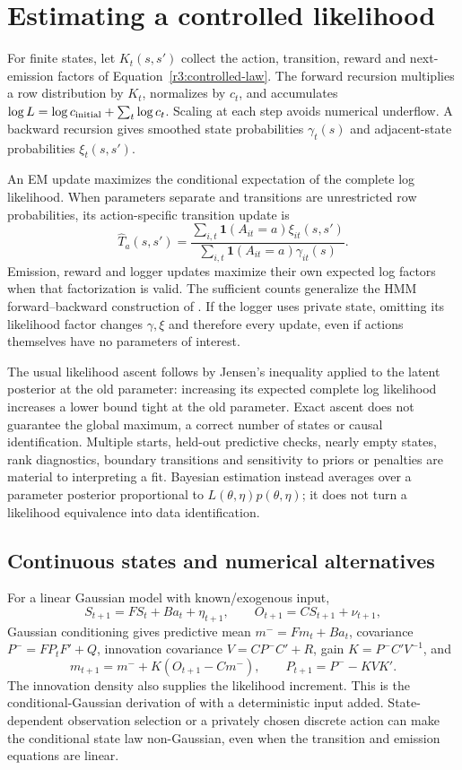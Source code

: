 \section{Estimating a controlled likelihood}
\label{r3:controlled-estimation}
For finite states, let $K_t(s,s')$ collect the action, transition,
reward and next-emission factors of Equation~\eqref{r3:controlled-law}.
The forward recursion multiplies a row distribution by $K_t$, normalizes
by $c_t$, and accumulates $\log L=\log c_{\rm initial}+\sum_t\log c_t$.
Scaling at each step avoids numerical underflow. A backward recursion
gives smoothed state probabilities $\gamma_t(s)$ and adjacent-state
probabilities $\xi_t(s,s')$.

An EM update maximizes the conditional expectation of the complete
log likelihood. When parameters separate and transitions are unrestricted
row probabilities, its action-specific transition update is
\begin{equation}
 \widehat T_a(s,s')=
 \frac{\sum_{i,t}\mathbf1(A_{it}=a)\xi_{it}(s,s')}
      {\sum_{i,t}\mathbf1(A_{it}=a)\gamma_{it}(s)}.
 \label{r3:controlled-em}
\end{equation}
Emission, reward and logger updates maximize their own expected log
factors when that factorization is valid. The sufficient counts generalize
the HMM forward--backward construction of \citet{rabiner1989}.
If the logger uses private state, omitting its likelihood factor changes
$\gamma,\xi$ and therefore every update, even if actions themselves
have no parameters of interest.

The usual likelihood ascent follows by Jensen's inequality applied to
the latent posterior at the old parameter: increasing its expected
complete log likelihood increases a lower bound tight at the old
parameter. Exact ascent does not guarantee the global maximum, a
correct number of states or causal identification. Multiple starts,
held-out predictive checks, nearly empty states, rank diagnostics,
boundary transitions and sensitivity to priors or penalties are material
to interpreting a fit. Bayesian estimation instead averages over a
parameter posterior proportional to $L(\theta,\eta)p(\theta,\eta)$;
it does not turn a likelihood equivalence into data identification.

\subsection{Continuous states and numerical alternatives}
For a linear Gaussian model with known/exogenous input,
\[
 S_{t+1}=FS_t+Ba_t+\eta_{t+1},\qquad O_{t+1}=CS_{t+1}+\nu_{t+1},
\]
Gaussian conditioning gives predictive mean $m^-=Fm_t+Ba_t$,
covariance $P^-=FP_tF'+Q$, innovation covariance
$V=CP^-C'+R$, gain $K=P^-C'V^{-1}$, and
\[
 m_{t+1}=m^-+K(O_{t+1}-Cm^-),\qquad
 P_{t+1}=P^--KVK'.
\]
The innovation density also supplies the likelihood increment.
This is the conditional-Gaussian derivation of
\citet[Theorem 4.2 and Theorem 12.1]{sarkka2013} with a deterministic
input added. State-dependent observation selection or a privately
chosen discrete action can make the conditional state law non-Gaussian,
even when the transition and emission equations are linear.

